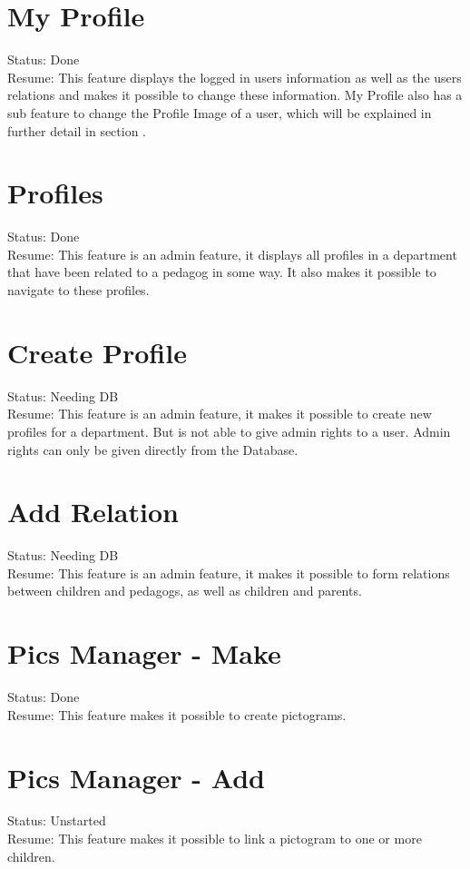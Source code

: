 \section{My Profile}
Status: Done\\
Resume: This feature displays the logged in users information as well as the users relations and makes it possible to change these information. My Profile also has a sub feature to change the Profile Image of a user, which will be explained in further detail in section .

\section{Profiles}
Status: Done\\
Resume: This feature is an admin feature, it displays all profiles in a department that have been related to a pedagog in some way. It also makes it possible to navigate to these profiles.

\section{Create Profile}
Status: Needing DB\\
Resume: This feature is an admin feature, it makes it possible to create new profiles for a department. But is not able to give admin rights to a user. Admin rights can only be given directly from the Database.

\section{Add Relation}
Status: Needing DB\\
Resume: This feature is an admin feature, it makes it possible to form relations between children and pedagogs, as well as children and parents.

\section{Pics Manager - Make}
Status: Done\\
Resume: This feature makes it possible to create pictograms.

\section{Pics Manager - Add}
Status: Unstarted\\
Resume: This feature makes it possible to link a pictogram to one or more children.

